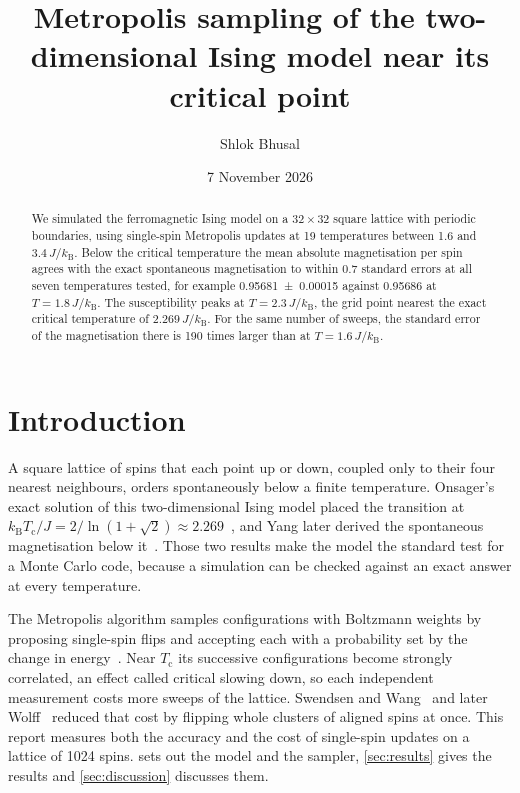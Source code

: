 
\title{Metropolis sampling of the two-dimensional Ising model near its critical point}
\author{Shlok Bhusal}
\date{7 November 2026}
\newcommand{\specimensource}{research/specimens/simulate.py}

\maketitle

\begin{abstract}
We simulated the ferromagnetic Ising model on a $32 \times 32$ square lattice with periodic boundaries, using single-spin Metropolis updates at 19 temperatures between 1.6 and $3.4\,J/k_\mathrm{B}$. Below the critical temperature the mean absolute magnetisation per spin agrees with the exact spontaneous magnetisation to within 0.7 standard errors at all seven temperatures tested, for example \num{0.95681(15)} against \num{0.95686} at $T = 1.8\,J/k_\mathrm{B}$. The susceptibility peaks at $T = 2.3\,J/k_\mathrm{B}$, the grid point nearest the exact critical temperature of $2.269\,J/k_\mathrm{B}$. For the same number of sweeps, the standard error of the magnetisation there is 190 times larger than at $T = 1.6\,J/k_\mathrm{B}$.
\end{abstract}

\section{Introduction}

A square lattice of spins that each point up or down, coupled only to their four nearest neighbours, orders spontaneously below a finite temperature. Onsager's exact solution of this two-dimensional Ising model placed the transition at $k_\mathrm{B} T_\mathrm{c} / J = 2 / \ln(1 + \sqrt{2}) \approx 2.269$~\cite{onsager1944}, and Yang later derived the spontaneous magnetisation below it~\cite{yang1952}. Those two results make the model the standard test for a Monte Carlo code, because a simulation can be checked against an exact answer at every temperature.

The Metropolis algorithm samples configurations with Boltzmann weights by proposing single-spin flips and accepting each with a probability set by the change in energy~\cite{metropolis1953}. Near $T_\mathrm{c}$ its successive configurations become strongly correlated, an effect called critical slowing down, so each independent measurement costs more sweeps of the lattice. Swendsen and Wang~\cite{swendsen1987} and later Wolff~\cite{wolff1989} reduced that cost by flipping whole clusters of aligned spins at once. This report measures both the accuracy and the cost of single-spin updates on a lattice of 1024 spins.  sets out the model and the sampler, \cref{sec:results} gives the results and \cref{sec:discussion} discusses them.

